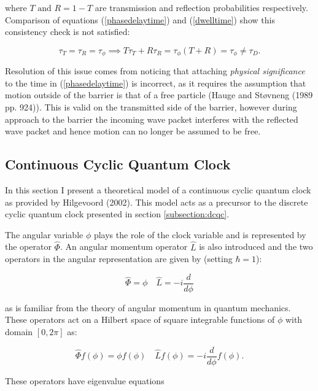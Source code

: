 \documentclass{article}
\begin{document}
\noindent where $T \text{ and } R = 1-T$ are transmission and reflection probabilities respectively. Comparison of equations (\ref{phasedelaytime}) and (\ref{dwelltime}) show this consistency check is not satisfied:

\begin{equation}
	\tau_T = \tau_R = \tau_\phi \implies T\tau_T+R\tau_R = \tau_\phi(T+R) = \tau_\phi \neq \tau_D. 
\end{equation}

Resolution of this issue comes from noticing that attaching \textit{physical significance} to the time in (\ref{phasedelaytime}) is incorrect, as it requires the assumption that motion outside of the barrier is that of a free particle (Hauge and St{\o}vneng (1989 pp. 924)). This is valid on the transmitted side of the barrier, however during approach to the barrier the incoming wave packet interferes with the reflected wave packet and hence motion can no longer be assumed to be free.
\subsection{Continuous Cyclic Quantum Clock}
\label{subsection:ccqc}

In this section I present a theoretical model of a continuous cyclic quantum clock as provided by Hilgevoord (2002). This model acts as a precursor to the discrete cyclic quantum clock presented in section \ref{subsection:dcqc}.

The angular variable $\phi$ plays the role of the clock variable and is represented by the operator $\hat{\Phi}$. An angular momentum operator $\hat{L}$ is also introduced and the two operators in the angular representation are given by (setting $\hbar = 1$):

\begin{equation}
	\hat{\Phi} = \phi \quad \hat{L} = -i \frac{d}{d\phi}
\end{equation}

\noindent as is familiar from the theory of angular momentum in quantum mechanics. These operators act on a Hilbert space of square integrable functions of $\phi$ with domain $[0,2\pi]$ as:

\begin{equation}
	\hat{\Phi} f(\phi) = \phi f(\phi) \quad \hat{L} f(\phi) = -i \frac{d}{d\phi}f(\phi).
\end{equation}

\noindent These operators have eigenvalue equations 
\end{document}

